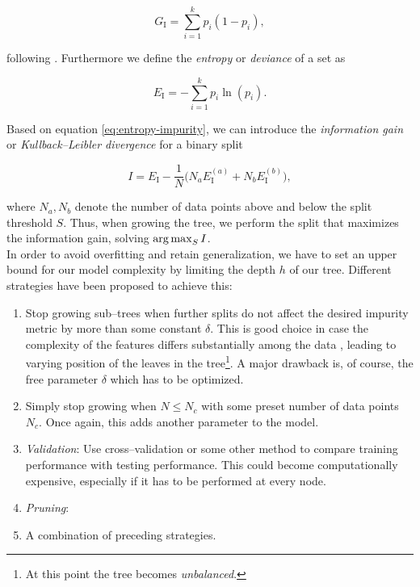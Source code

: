 \begin{equation}
\label{eq:gini-impurity}
G_{\text{I}} = \sum\limits_{i=1}^k p_i (1 - p_i),
\end{equation}

following \citet{astroML,hastie2001,ripley2007}. Furthermore we define the \emph{entropy} or \emph{deviance} of a set as

\begin{equation}
\label{eq:entropy-impurity}
E_{\text{I}} = - \sum\limits_{i=1}^k p_i \ln(p_i).
\end{equation}

Based on equation \eqref{eq:entropy-impurity}, we can introduce the \emph{information gain} or \emph{Kullback--Leibler divergence} \citep{kullback1951} for a binary split

\begin{equation}
\label{eq:information-gain}
I = E_{\text{I}} - \frac{1}{N} \big(N_a E_{\text{I}}^{(a)} + N_b E_{\text{I}}^{(b)}\big),
\end{equation}

where $N_a, N_b$ denote the number of data points above and below the split threshold $S$. Thus, when growing the tree, we perform the split that maximizes the information gain, \ie solving $\operatorname*{arg\,max}_S I$.\\


In order to avoid overfitting and retain generalization, we have to set an upper bound for our model complexity by limiting the depth $h$ of our tree. Different strategies have been proposed to achieve this:

\begin{enumerate}
\item \label{itm:constant-metric} Stop growing sub--trees when further splits do not affect the desired impurity metric by more than some constant $\delta$. This is good choice in case the complexity of the features differs substantially among the data \citep{duda2001}, leading to varying position of the leaves in the tree\footnote{At this point the tree becomes \emph{unbalanced}.}. A major drawback is, of course, the free parameter $\delta$ which has to be optimized.
\item \label{itm:constant-data-points} Simply stop growing when $N \le N_c$ with some preset number of data points $N_c$. Once again, this adds another parameter to the model.
\item \label{itm:validation} \emph{Validation}: Use cross--validation or some other method to compare training performance with testing performance. This could become computationally expensive, especially if it has to be performed at every node.
\item \label{itm:pruning} \emph{Pruning}: %
\item A combination of preceding strategies.
\end{enumerate}

